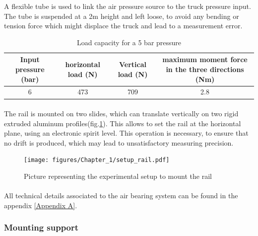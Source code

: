 A flexible tube is used to link the air pressure source to the truck pressure input. The tube is suspended at a 2m height and left loose, to avoid any bending or tension force which might displace the truck and lead to a measurement error.
\begin{table}[H]
	\centering
		\begin{adjustbox}{width=\textwidth}
			\begin{tabular}{|c|c|c|c|}
				\hline
				Input pressure (bar) & horizontal load (N)&Vertical load (N)& maximum moment force in the three directions (Nm) \\
				\hline
				6&473&709&2.8\\
				\hline
			\end{tabular}
		\end{adjustbox}
	\caption{Load capacity for a 5 bar pressure}
	\label{tab:pressure_truck}
\end{table}
\paragraph{}
The rail is mounted on two slides, which can translate vertically on two rigid extruded aluminum profiles(fig.\ref{fig:setup_rail}). This allows to set the rail at the horizontal plane, using an electronic spirit level. This operation is necessary, to ensure that no drift is produced, which may lead to unsatisfactory measuring precision.
\begin{figure}[H] %
	\centering%
	\texttt{[image: figures/Chapter\_1/setup\_rail.pdf]}
	\caption{Picture representing the experimental setup to mount the rail}
	\label{fig:setup_rail}
\end{figure}

\paragraph{}
All technical details associated to the air bearing system can be found in the appendix \ref{Appendix A}.
\subsubsection{Mounting support}
